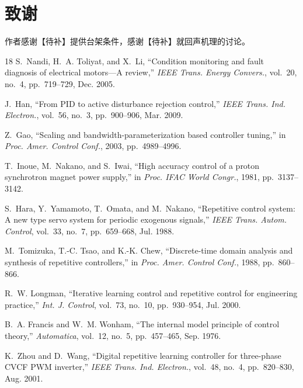 \documentclass[journal]{IEEEtran}
\theoremstyle{remark}
\begin{document}
\section*{致谢}
作者感谢【待补】提供台架条件，感谢【待补】就回声机理的讨论。


\begin{thebibliography}{18}
S.~Nandi, H.~A. Toliyat, and X.~Li, \textquotedblleft{}Condition monitoring and fault diagnosis of electrical motors---A review,\textquotedblright{} \emph{IEEE Trans. Energy Convers.}, vol.~20, no.~4, pp.~719--729, Dec. 2005.

J.~Han, \textquotedblleft{}From PID to active disturbance rejection control,\textquotedblright{} \emph{IEEE Trans. Ind. Electron.}, vol.~56, no.~3, pp.~900--906, Mar. 2009.

Z.~Gao, \textquotedblleft{}Scaling and bandwidth-parameterization based controller tuning,\textquotedblright{} in \emph{Proc. Amer. Control Conf.}, 2003, pp.~4989--4996.

T.~Inoue, M.~Nakano, and S.~Iwai, \textquotedblleft{}High accuracy control of a proton synchrotron magnet power supply,\textquotedblright{} in \emph{Proc. IFAC World Congr.}, 1981, pp.~3137--3142.

S.~Hara, Y.~Yamamoto, T.~Omata, and M.~Nakano, \textquotedblleft{}Repetitive control system: A new type servo system for periodic exogenous signals,\textquotedblright{} \emph{IEEE Trans. Autom. Control}, vol.~33, no.~7, pp.~659--668, Jul. 1988.

M.~Tomizuka, T.-C. Tsao, and K.-K. Chew, \textquotedblleft{}Discrete-time domain analysis and synthesis of repetitive controllers,\textquotedblright{} in \emph{Proc. Amer. Control Conf.}, 1988, pp.~860--866.

R.~W. Longman, \textquotedblleft{}Iterative learning control and repetitive control for engineering practice,\textquotedblright{} \emph{Int. J. Control}, vol.~73, no.~10, pp.~930--954, Jul. 2000.

B.~A. Francis and W.~M. Wonham, \textquotedblleft{}The internal model principle of control theory,\textquotedblright{} \emph{Automatica}, vol.~12, no.~5, pp.~457--465, Sep. 1976.

K.~Zhou and D.~Wang, \textquotedblleft{}Digital repetitive learning controller for three-phase CVCF PWM inverter,\textquotedblright{} \emph{IEEE Trans. Ind. Electron.}, vol.~48, no.~4, pp.~820--830, Aug. 2001.


\end{thebibliography}
\end{document}
